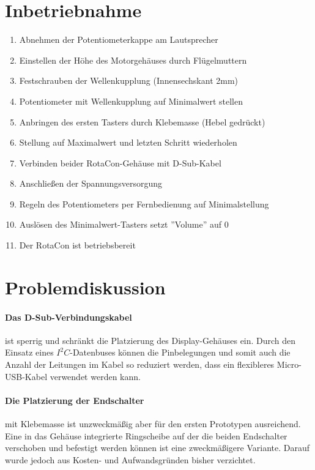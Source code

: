 \documentclass[11pt, titlepage, fleqn]{report}
\begin{document}
		\section{Inbetriebnahme}
			\label{sec:HowTo}
			\begin{enumerate}
				\item Abnehmen der Potentiometerkappe am Lautsprecher
				\item Einstellen der Höhe des Motorgehäuses durch Flügelmuttern
				\item Festschrauben der Wellenkupplung (Innensechskant 2mm)
				\item Potentiometer mit Wellenkupplung auf Minimalwert stellen
				\item Anbringen des ersten Tasters durch Klebemasse (Hebel gedrückt)
				\item Stellung auf Maximalwert und letzten Schritt wiederholen
				\item Verbinden beider RotaCon-Gehäuse mit D-Sub-Kabel
				\item Anschließen der Spannungsversorgung
				\item Regeln des Potentiometers per Fernbedienung auf Minimalstellung
				\item Auslösen des Minimalwert-Tasters setzt ''Volume'' auf 0
				\item Der RotaCon ist betriebsbereit
			\end{enumerate}
		\newpage
		\section{Problemdiskussion}
		\label{sec:Probleme}
			\paragraph{Das D-Sub-Verbindungskabel}
			ist sperrig und schränkt die Platzierung des Display-Gehäuses ein. Durch den Einsatz eines $I^{2}C$-Datenbuses können die Pinbelegungen und somit auch die Anzahl der Leitungen im Kabel so reduziert werden, dass ein flexibleres Micro-USB-Kabel verwendet werden kann.
			
			\paragraph{Die Platzierung der Endschalter}
			mit Klebemasse ist unzweckmäßig aber für den ersten Prototypen ausreichend. Eine in das Gehäuse integrierte Ringscheibe auf der die beiden Endschalter verschoben und befestigt werden können ist eine zweckmäßigere Variante. Darauf wurde jedoch aus Kosten- und Aufwandsgründen bisher verzichtet.
			
\end{document}
